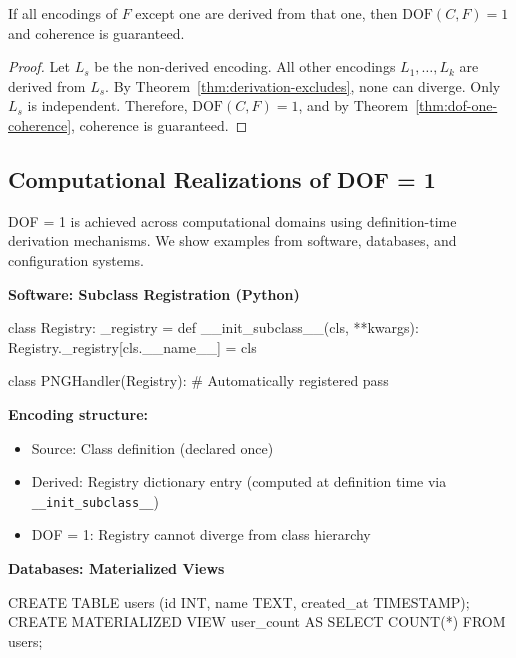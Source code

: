\begin{corollary}\label{cor:metaprogramming}
If all encodings of $F$ except one are derived from that one, then $\text{DOF}(C, F) = 1$ and coherence is guaranteed.
\end{corollary}

\begin{proof}
Let $L_s$ be the non-derived encoding. All other encodings $L_1, \ldots, L_k$ are derived from $L_s$. By Theorem~\ref{thm:derivation-excludes}, none can diverge. Only $L_s$ is independent. Therefore, $\text{DOF}(C, F) = 1$, and by Theorem~\ref{thm:dof-one-coherence}, coherence is guaranteed.
\end{proof}

\subsection{Computational Realizations of DOF = 1}\label{sec:ssot-patterns}

DOF = 1 is achieved across computational domains using definition-time derivation mechanisms. We show examples from software, databases, and configuration systems.

\textbf{Software: Subclass Registration (Python)}

\begin{code}
class Registry:
    _registry = {}
    def __init_subclass__(cls, **kwargs):
        Registry._registry[cls.__name__] = cls

class PNGHandler(Registry):  # Automatically registered
    pass
\end{code}

\textbf{Encoding structure:}
\begin{itemize}
\tightlist
\item Source: Class definition (declared once)
\item Derived: Registry dictionary entry (computed at definition time via \texttt{\_\_init\_subclass\_\_})
\item DOF = 1: Registry cannot diverge from class hierarchy
\end{itemize}

\textbf{Databases: Materialized Views}

\begin{code}
CREATE TABLE users (id INT, name TEXT, created_at TIMESTAMP);
CREATE MATERIALIZED VIEW user_count AS
  SELECT COUNT(*) FROM users;
\end{code}

